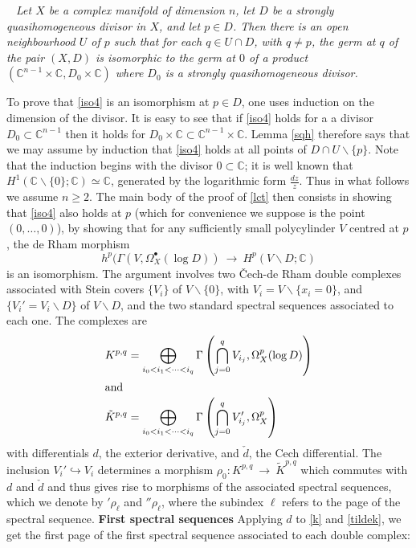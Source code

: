 \documentclass[12pt]{article}
\newcommand{\CC}{\mathbb{C}}
\newcommand\bu{\bullet}
\newcommand\vsn{\vskip 10pt\noindent}
\newcommand\ssm{\smallsetminus}
\newcommand\ld{{\ldots}}
\newcounter{numero}[section]
\renewcommand{\thenumero}{(\arabic{section}.\arabic{numero})}
\newenvironment{lema}{\medskip
\refstepcounter{numero}\noindent {\sc  \thenumero\ Lemma.}\
\it}{\vspace{1ex}\par}
\newcommand\tos{{\ \rightarrow\ }}
\begin{document}
\begin{lema}\label{sqh}
Let $X$ be a
complex manifold of dimension $n$, let $D$ be a
strongly quasihomogeneous divisor in $X$, and let $p\in D$. Then there is an
open neighbourhood $U$ of $p$ such that for each $q\in U \cap D$, with $q\neq  p$, the germ at $q$ of the
pair $(X,D)$ is isomorphic to the germ at $0$ of a product
$(\CC^{n-1}\times\CC, D_0\times\CC)$ where $D_0$ is a strongly quasihomogeneous divisor.
\end{lema}
\vsn
To prove that \eqref{iso4} is an isomorphism at $p\in D$, one uses induction on the dimension of the divisor. It is easy to see that if \eqref{iso4} holds for a a divisor $D_0\subset \CC^{n-1}$ then it holds for $D_0\times\CC\subset \CC^{n-1}\times\CC$. Lemma \ref{sqh} therefore says that we may assume by induction that \eqref{iso4} holds at all points of $D\cap U\ssm\{p\}$. Note that the induction begins with the divisor
$0\subset\CC$; it is well known that $H^1(\CC\ssm\{0\};\CC)\simeq\CC$, generated by the logarithmic form $\frac{dz}{z}$. Thus in what follows we assume $n\geq 2$.
\vsn
The main body of the proof of \ref{lct} then consists in showing that \eqref{iso4} also holds at $p$ (which for convenience we suppose is the point $(0,\ld,0)$), by showing that for any sufficiently small polycylinder $V$ centred at $p$, the de Rham morphism $$h^p(\Gamma(V,\Omega_X^\bu(\log D))\tos H^p(V\ssm D;\CC)$$ is an isomorphism. The argument involves two \v Cech-de Rham double complexes associated with Stein covers
$\{V_i\}$ of $V\ssm\{0\}$, with $V_i=V\ssm\{x_i=0\}$, and $\{V_i'=V_i\ssm D\}$ of $V\ssm D$, and the two standard spectral sequences associated to each one. The complexes are
\begin{align}K^{p,q}&=\bigoplus_{i_0<i_1<\cdots<i_q}\Gamma\left(\bigcap_{j=0}^qV_{i_j}, {\Omega}_X^p(\log D)\right)\label{k}\\
\intertext{and}
\tilde K^{p,q}&=\bigoplus_{i_0<i_1<\cdots<i_q}\Gamma\left(\bigcap_{j=0}^qV'_{i_j}, {\Omega}_X^p\right)\label{tildek}
\end{align}
with differentials $d$, the exterior derivative, and $\check d$, the Cech differential. The inclusion $V_i'\hookrightarrow V_i$ determines a morphism $\rho_0:K^{p,q}\tos \tilde K^{p,q}$ which commutes with $d$ and $\check d$ and thus gives rise to morphisms of the associated spectral sequences, which we denote by $'\rho_\ell$ and $''\rho_\ell$, where the subindex $\ell$ refers to the page of the spectral sequence.
\vsn
{\bf First spectral sequences}
\vsn
Applying $d$ to \eqref{k} and \eqref{tildek}, we get the first page of the first spectral sequence associated to each double complex:
\end{document}
